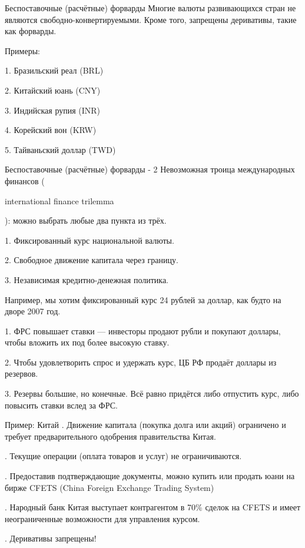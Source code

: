 \documentclass{beamer}
\newcommand{\en}[1]{\begin{otherlanguage}{english}#1\end{otherlanguage}}
\begin{document}
\begin{frame}{Беспоставочные (расчётные) форварды}
\justify
Многие валюты развивающихся стран не являются свободно-конвертируемыми. Кроме того, запрещены деривативы, такие как форварды.

\justify
Примеры:

1. Бразильский реал (BRL)

2. Китайский юань (CNY)

3. Индийская рупия (INR)

4. Корейский вон (KRW)

5. Тайваньский доллар (TWD)
\end{frame}



\begin{frame}{Беспоставочные (расчётные) форварды - 2}
\justify
Невозможная троица международных финансов (\en{international finance trilemma}): можно выбрать любые два пункта из трёх.

1. Фиксированный курс национальной валюты.

2. Свободное движение капитала через границу.

3. Независимая кредитно-денежная политика.

\justify
Например, мы хотим фиксированный курс 24 рублей за доллар, как будто на дворе 2007 год.

1. ФРС повышает ставки --- инвесторы продают рубли и покупают доллары, чтобы вложить их под более высокую ставку.

2. Чтобы удовлетворить спрос и удержать курс, ЦБ РФ продаёт доллары из резервов.

3. Резервы большие, но конечные. Всё равно придётся либо отпустить курс, либо повысить ставки вслед за ФРС.

\end{frame}



\begin{frame}{Пример: Китай}
. Движение капитала (покупка долга или акций) ограничено и требует предварительного одобрения правительства Китая.

. Текущие операции (оплата товаров и услуг) не ограничиваются. 

. Предоставив подтверждающие документы, можно купить или продать юани на бирже CFETS (China Foreign Exchange Trading System)

. Народный банк Китая выступает контрагентом в 70\% сделок на CFETS и имеет неограниченные возможности для управления курсом.

. Деривативы запрещены!
\end{frame}
\end{document}
